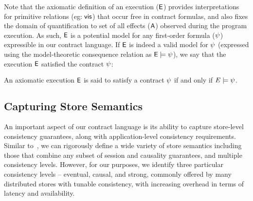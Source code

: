 Note that the axiomatic definition of an execution (${\normalfont \textsf{E}}$) provides
interpretations for primitive relations (eg: ${\normalfont \textsf{vis}}$) that occur free in
contract formulas, and also fixes the domain of quantification to set of all
effects (${\normalfont \textsf{A}}$) observed during the program execution. As such, ${\normalfont \textsf{E}}$ is a
potential model for any first-order formula ($\psi$) expressible in our contract
language. If ${\normalfont \textsf{E}}$ is indeed a valid model for $\psi$ (expressed using the
model-theoretic consequence relation as ${\normalfont \textsf{E}} \models \psi$), we say that the
execution ${\normalfont \textsf{E}}$ satisfied the contract $\psi$:
\begin{definition}
An axiomatic execution ${\normalfont \textsf{E}}$ is said to satisfy a contract $\psi$ if and
only if $E \models \psi$.
\end{definition}

\subsection{Capturing Store Semantics}
\label{sec:store_sem}

An important aspect of our contract language is its ability to capture
store-level consistency guarantees, along with application-level consistency
requirements. Similar to~\cite{Burckhardt2014}, we can rigorously define a wide
variety of store semantics including those that combine any subset of session
and causality guarantees, and multiple consistency levels.  However, for our
purposes, we identify three particular consistency levels -- eventual, causal,
and strong, commonly offered by many distributed stores with tunable
consistency, with increasing overhead in terms of latency and availability.

